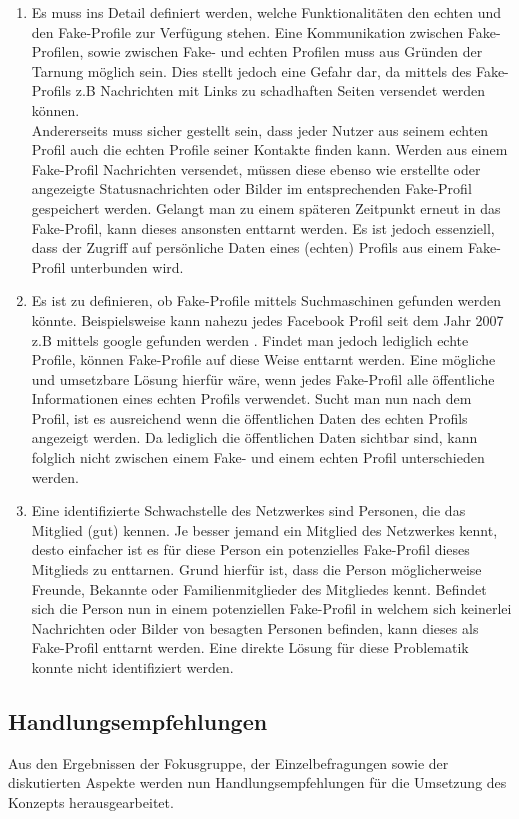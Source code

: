 \documentclass{sigchi}
\begin{document}
\begin{enumerate}
	\item Es muss ins Detail definiert werden, welche Funktionalitäten den echten und den Fake-Profile zur Verfügung stehen. Eine Kommunikation zwischen Fake-Profilen, sowie zwischen Fake- und echten Profilen muss aus Gründen der Tarnung möglich sein. Dies stellt jedoch eine Gefahr dar, da mittels des Fake-Profils z.B Nachrichten mit Links zu schadhaften Seiten versendet werden können.\\ Andererseits muss sicher gestellt sein, dass jeder Nutzer aus seinem echten Profil auch die echten Profile seiner Kontakte finden kann. Werden aus einem Fake-Profil Nachrichten versendet, müssen diese ebenso wie erstellte oder angezeigte Statusnachrichten oder Bilder im entsprechenden Fake-Profil gespeichert werden. Gelangt man zu einem späteren Zeitpunkt erneut in das Fake-Profil, kann dieses ansonsten enttarnt werden. Es ist jedoch essenziell, dass der Zugriff auf persönliche Daten eines (echten) Profils aus einem Fake-Profil unterbunden wird.
	\item Es ist zu definieren, ob Fake-Profile mittels Suchmaschinen gefunden werden könnte. Beispielsweise kann nahezu jedes Facebook Profil seit dem Jahr 2007 z.B mittels google gefunden werden \cite{FB_Google}. Findet man jedoch lediglich echte Profile, können Fake-Profile auf diese Weise enttarnt werden. Eine mögliche und umsetzbare Lösung hierfür wäre, wenn jedes Fake-Profil alle öffentliche Informationen eines echten Profils verwendet. Sucht man nun nach dem Profil, ist es ausreichend wenn die öffentlichen Daten des echten Profils angezeigt werden. Da lediglich die öffentlichen Daten sichtbar sind, kann folglich nicht zwischen einem Fake- und einem echten Profil unterschieden werden.
	\item Eine identifizierte Schwachstelle des Netzwerkes sind Personen, die das Mitglied (gut) kennen. Je besser jemand ein Mitglied des Netzwerkes kennt, desto einfacher ist es für diese Person ein potenzielles Fake-Profil dieses Mitglieds zu enttarnen. Grund hierfür ist, dass die Person möglicherweise Freunde, Bekannte oder Familienmitglieder des Mitgliedes kennt. Befindet sich die Person nun in einem potenziellen Fake-Profil in welchem sich keinerlei Nachrichten oder Bilder von besagten Personen befinden, kann dieses als Fake-Profil enttarnt werden. Eine direkte Lösung für diese Problematik konnte nicht identifiziert werden. 
\end{enumerate}

\subsection{Handlungsempfehlungen}
\label{Handlungsempfehlung}
Aus den Ergebnissen der Fokusgruppe, der Einzelbefragungen sowie der diskutierten Aspekte werden nun Handlungsempfehlungen für die Umsetzung des Konzepts herausgearbeitet.
\end{document}
